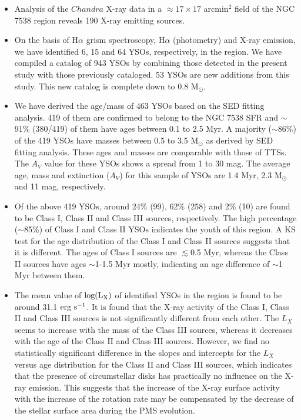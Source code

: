 \documentclass[a4paper,fleqn,usenatbib,useAMS]{mnras}
\begin{document}
\begin{itemize}

\item
Analysis of the $Chandra$ X-ray data  in a $\approx 17\times17$ arcmin$^2$ field of the NGC 7538 region reveals 190 X-ray emitting sources.


\item
On the basis of H$\alpha$ grism spectroscopy,  
H$\alpha$ (photometry) and X-ray emission, we have identified 6, 15 and 64 YSOs, respectively, in the region.
We have compiled a catalog of 943 YSOs by combining those detected in the present study
with those previously cataloged. 53 YSOs are new additions from this study.
This new catalog is complete down to 0.8 M$_\odot$.

\item
We have derived the age/mass of 463 YSOs based on the SED fitting analysis.
419 of them are confirmed to belong to the NGC 7538 SFR and
$\sim$91\% (380/419) of them have ages between 0.1 to 2.5 Myr.
A majority ($\sim$86\%) of the 419 YSOs have masses between 0.5 to 3.5 M$_\odot$
as derived by SED fitting analysis.
These ages and masses are comparable with those of TTSs.
The $A_V$ value for these YSOs shows a spread from 1 to 30 mag.
The average age, mass and extinction ($A_V$) for this sample of YSOs are 1.4 Myr, 2.3 M$_\odot$ and 11 mag, respectively.

\item
Of the above 419 YSOs, around 24\% (99), 62\% (258) and 2\% (10) are found to be Class I, Class II and Class III sources, respectively.
The high percentage ($\sim$85\%) of Class I and Class II YSOs indicates the youth of this region.
A KS test for the age distribution of the Class I and Class II sources
suggests that it is  different.
The ages of Class I sources are $\lesssim$0.5 Myr, whereas the Class II sources have ages 
$\sim$1-1.5 Myr mostly, indicating an age difference of $\sim$1 Myr between them.

\item
The mean value of $\rm{log(L_X)}$ of identified YSOs in the region is found to be around 31.1 $\rm{erg~s^{-1}}$.
It is found that the X-ray activity of the Class I, Class II and Class III sources is not significantly different from each other.
The $L_X$ seems to increase with the mass of the Class III sources, whereas it decreases with the age of the Class II and Class III sources. 
However, we find no statistically significant difference in the slopes and intercepts for the
$L_X$ versus age distribution for the Class II and Class III sources, which indicates that the presence
of circumstellar disks has practically no influence on the X-ray emission.
This suggests that the  increase of the X-ray surface activity with the increase of the 
rotation rate may be compensated by the decrease of the stellar surface 
area during the PMS evolution.



\end{itemize}
\end{document}
